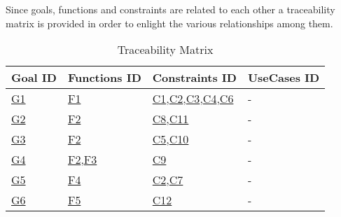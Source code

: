 Since goals, functions and constraints are related to each other a traceability matrix is provided in order to enlight the various relationships among them.
\begin{flushleft}

\begin{table}[htp]
\centering
\begin{tabular}{|l|l|l|l|}
\hline
Goal ID&Functions ID&Constraints ID&UseCases ID\\
\hline
\hyperlink{G1}{G1}&\hyperlink{sec:f1}{F1}&\hyperlink{C1}{C1},\hyperlink{C2}{C2},\hyperlink{C3}{C3},\hyperlink{C4}{C4},\hyperlink{C6}{C6}&-\\
\hline
\hyperlink{G2}{G2}&\hyperlink{sec:f2}{F2}&\hyperlink{C8}{C8},\hyperlink{C11}{C11}&-\\
\hline
\hyperlink{G3}{G3}&\hyperlink{sec:f2}{F2}&\hyperlink{C5}{C5},\hyperlink{C10}{C10}&-\\
\hline
\hyperlink{G4}{G4}&\hyperlink{sec:f2}{F2},\hyperlink{sec:f3}{F3}&\hyperlink{C9}{C9}&-\\
\hline
\hyperlink{G5}{G5}&\hyperlink{sec:f4}{F4}&\hyperlink{C2}{C2},\hyperlink{C7}{C7}&-\\
\hline
\hyperlink{G6}{G6}&\hyperlink{sec:f5}{F5}&\hyperlink{12}{C12}&-\\
\hline

\end{tabular}

\caption{Traceability Matrix} 

\end{table}

\end{flushleft}